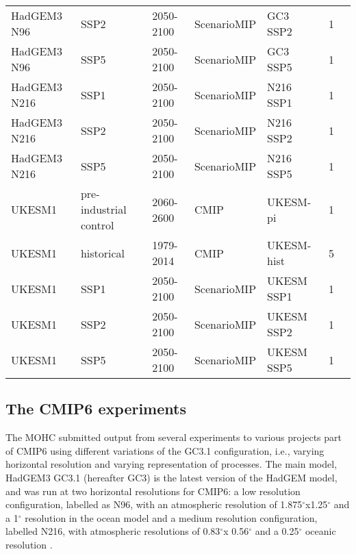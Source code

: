 \begin{sidewaystable}
\begin{tabular}{p{3.1cm}|p{3.8cm}p{}p{2.8cm}p{3.5cm}p{0.9cm}p{3.6cm}}
HadGEM3 N96   & SSP2 & 2050-2100 & ScenarioMIP  & GC3 SSP2  & 1  &   \citep{o2016}                          \\
HadGEM3 N96   & SSP5 & 2050-2100 & ScenarioMIP  & GC3 SSP5 & 1  &   \citep{o2016}                          \\
HadGEM3 N216   & SSP1 & 2050-2100 & ScenarioMIP  & N216 SSP1  & 1  &   \citep{o2016}                          \\
HadGEM3 N216   & SSP2 & 2050-2100 & ScenarioMIP  & N216 SSP2  & 1  &   \citep{o2016}                          \\
HadGEM3 N216   & SSP5 & 2050-2100 & ScenarioMIP  & N216 SSP5  & 1  &   \citep{o2016}                          \\
UKESM1   &  pre-industrial control  & 2060-2600       & CMIP & UKESM-pi      & 1 & \citep{ukesmpi}            \\
UKESM1   &  historical  & 1979-2014       & CMIP & UKESM-hist & 5     &  \citep{ukesmhist}            \\
UKESM1  & SSP1 & 2050-2100 & ScenarioMIP  & UKESM SSP1  & 1  &   \citep{o2016}                          \\
UKESM1  & SSP2 & 2050-2100 & ScenarioMIP  & UKESM SSP2  & 1  &   \citep{o2016}                          \\
UKESM1   & SSP5 & 2050-2100 & ScenarioMIP  & UKESM SSP5  & 1  &   \citep{o2016}
\end{tabular}
\end{sidewaystable}

\subsection{The CMIP6 experiments}\label{sq:cmip6exp}

The MOHC submitted output from several experiments to various projects part of CMIP6 using different variations of the GC3.1 configuration, i.e., varying horizontal resolution and varying representation of processes. 
The main model, HadGEM3 GC3.1 (hereafter GC3) is the latest version of the HadGEM model, and was run at two horizontal resolutions for CMIP6: a low resolution configuration, labelled as N96, with an atmospheric resolution of 1.875$^\circ$x1.25$^\circ$ and a 1$^\circ$ resolution in the ocean model and a medium resolution configuration, labelled N216, with atmospheric resolutions of 0.83$^\circ$x 0.56$^\circ$ and a 0.25$^\circ$ oceanic resolution \citep{menary2018}. 

